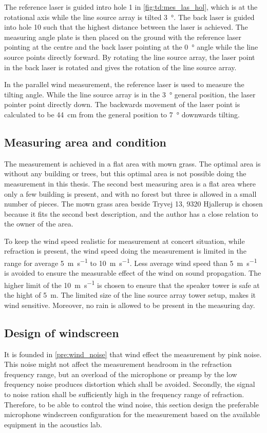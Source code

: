 The reference laser is guided intro hole 1 in \autoref{fig:td:mes_las_hol}, which is at the rotational axis while the line source array is tilted \SI{3}{\degree}. The back laser is guided into hole 10 such that the highest distance between the laser is achieved. The measuring angle plate is then placed on the ground with the reference laser pointing at the centre and the back laser pointing at the \SI{0}{\degree} angle while the line source points directly forward. By rotating the line source array, the laser point in the back laser is rotated and gives the rotation of the line source array. 

In the parallel wind measurement, the reference laser is used to measure the tilting angle. While the line source array is in the \SI{3}{\degree} general position, the laser pointer point directly down. The backwards movement of the laser point is calculated to be \SI{44}{\centi\meter} from the general position to  \SI{7}{\degree} downwards tilting.

\subsection{Measuring area and condition}
The measurement is achieved in a flat area with mown grass. The optimal area is without any building or trees, but this optimal area is not possible doing the measurement in this thesis. The second best measuring area is a flat area where only a few building is present, and with no forest but three is allowed in a small number of pieces. The mown grass area beside Tryvej 13, 9320 Hjallerup is chosen because it fits the second best description, and the author has a close relation to the owner of the area.


To keep the wind speed realistic for measurement at concert situation, while refraction is present, the wind speed doing the measurement is limited in the range for average \SI{5}{\meter\per\second} to \SI{10}{\meter\per\second}. Less average wind speed than \SI{5}{\meter\per\second} is avoided to ensure the measurable effect of the wind on sound propagation. The higher limit of the \SI{10}{\meter\per\second} is chosen to ensure that the speaker tower is safe at the hight of \SI{5}{\meter}. The limited size of the line source array tower setup, makes it wind sensitive. Moreover, no rain is allowed to be present in the measuring day.

\subsection{Design of windscreen}\label{ds:wind_scr}
It is founded in \autoref{pre:wind_noise} that wind effect the measurement by pink noise. This noise might not affect the measurement headroom in the refraction frequency range, but an overload of the microphone or preamp by the low frequency noise produces distortion which shall be avoided. Secondly, the signal to noise ration shall be sufficiently high in the frequency range of refraction. Therefore, to be able to control the wind noise, this section design the preferable microphone windscreen configuration for the measurement based on the available equipment in the acoustics lab. 

